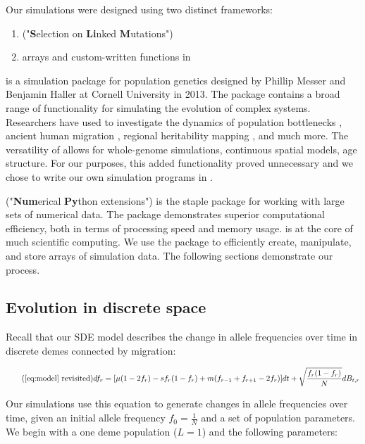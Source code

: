 Our simulations were designed using two distinct frameworks: 

\begin{enumerate}
    \item {} ("\textbf{S}election on \textbf{Li}nked \textbf{M}utations")
    \item {} arrays and custom-written functions in 
\end{enumerate}

 is a simulation package for population genetics designed by Phillip Messer and Benjamin Haller at Cornell University in 2013.\cite{slim} The package contains a broad range of functionality for simulating the evolution of complex systems. Researchers have used  to investigate the dynamics of population bottlenecks \cite{pederson_2017}, ancient human migration \cite{sikora_2017}, regional heritability mapping \cite{caballero_2015}, and much more. The versatility of  allows for whole-genome simulations, continuous spatial models, age structure. For our purposes, this added functionality proved unnecessary and we chose to write our own simulation programs in .  

 ("\textbf{Num}erical \textbf{Py}thon extensions") is the staple  package for working with large sets of numerical data. The package demonstrates superior computational efficiency, both in terms of processing speed and memory usage.  is at the core of much scientific computing.\cite{numpy} We use the package to efficiently create, manipulate, and store arrays of simulation data. The following sections demonstrate our process. 


\subsection{Evolution in discrete space}

Recall that our SDE model describes the change in allele frequencies over time in discrete demes connected by migration:

\begin{equation}
    \tag{\ref{eq:model} revisited}
    df_r=[\mu(1-2f_r)-sf_r (1-f_r ) + m (f_{r-1}+f_{r+1}-2f_r)]dt+\sqrt{\frac{f_r (1-f_r )}{N}} dB_{t,r}
\end{equation}

Our simulations use this equation to generate changes in allele frequencies over time, given an initial allele frequency $f_0 = \frac{1}{N}$ and a set of population parameters. We begin with a one deme population ($L = 1$) and the following parameters:

